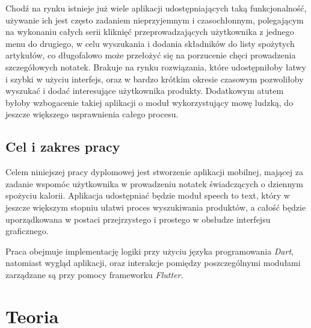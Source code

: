 \documentclass[12pt, a4paper]{article}
\begin{document}
\begin{sloppypar}
{{    Chodź na rynku istnieje już wiele aplikacji udostępniających taką funkcjonalność,
    używanie ich jest często zadaniem nieprzyjemnym i czasochłonnym, polegającym
    na wykonaniu całych serii kliknięć przeprowadzających użytkownika z jednego menu
    do drugiego, w celu wyszukania i dodania składników do listy spożytych artykułów,
    co długofalowo może przełożyć się na porzucenie chęci prowadzenia szczegółowych
    notatek. Brakuje na rynku rozwiązania, które udostępniłoby łatwy i szybki
    w użyciu interfejs, oraz w bardzo krótkim okresie czasowym pozwoliłoby wyszukać 
    i dodać interesujące użytkownika produkty. Dodatkowym atutem byłoby wzbogacenie
    takiej aplikacji o moduł wykorzystujący mowę ludzką, do jeszcze większego 
    usprawnienia całego procesu.
  }
  \subsection{Cel i zakres pracy}
  {
    Celem niniejszej pracy dyplomowej jest stworzenie aplikacji mobilnej, mającej 
    za zadanie wspomóc użytkownika w prowadzeniu notatek świadczących o dziennym
    spożyciu kalorii. Aplikacja udostępniać będzie moduł speech to text,
    który w jeszcze większym stopniu ułatwi proces wyszukiwania produktów, a całość
    będzie uporządkowana w postaci przejrzystego i prostego w obsłudze interfejsu
    graficznego.

    Praca obejmuje implementację logiki przy użyciu języka programowania \emph{Dart},
    natomiast wygląd aplikacji, oraz interakcje pomiędzy poszczególnymi modułami
    zarządzane są przy pomocy frameworku \emph{Flutter}.
  }

}

\section{Teoria}
{
}
\end{sloppypar}
\end{document}
